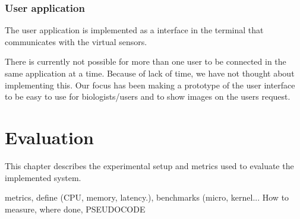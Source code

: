 \documentclass[USenglish]{uit-thesis}
\begin{document}
\subsection{User application} \label{ssec:user}
The user application is implemented as a interface in the terminal that communicates with the virtual sensors.

There is currently not possible for more than one user to be connected in the same application at a time. Because of lack of time, we have not thought about implementing this. Our focus has been making a prototype of the user interface to be easy to use for biologists/users and to show images on the users request.


\chapter{Evaluation} 
This chapter describes the experimental setup and metrics used to evaluate the implemented system. 

metrics, define (CPU, memory, latency.), benchmarks (micro, kernel...
How to measure, where done, PSEUDOCODE
\end{document}
